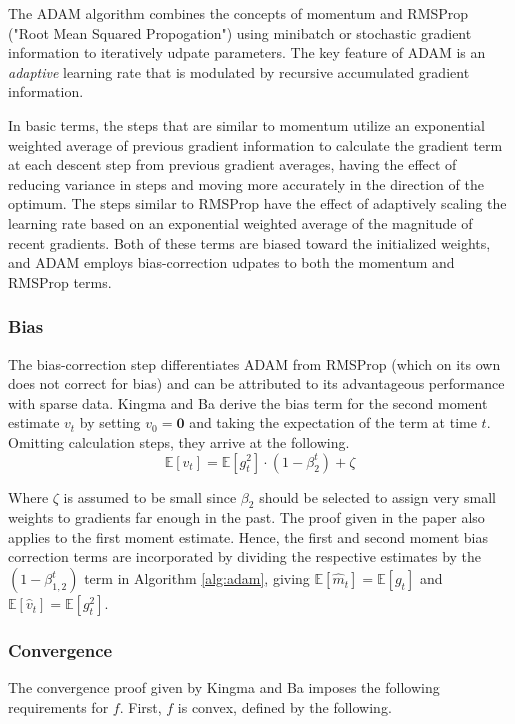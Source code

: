 \documentclass[letterpaper,11 pt]{article}
\begin{document}
The ADAM algorithm combines the concepts of momentum and RMSProp ("Root Mean Squared Propogation") using minibatch or stochastic gradient information to iteratively udpate parameters. The key feature of ADAM is an \textit{adaptive} learning rate that is modulated by recursive accumulated gradient information.  

In basic terms, the steps that are similar to momentum utilize an exponential weighted average of previous gradient information to calculate the gradient term at each descent step from previous gradient averages, having the effect of reducing variance in steps and moving more accurately in the direction of the optimum.  The steps similar to RMSProp have the effect of adaptively scaling the learning rate based on an exponential weighted average of the magnitude of recent gradients.  Both of these terms are biased toward the initialized weights, and ADAM employs bias-correction udpates to both the momentum and RMSProp terms.  

\subsubsection{Bias}

The bias-correction step differentiates ADAM from RMSProp (which on its own does not correct for bias) and can be attributed to its advantageous performance with sparse data. Kingma and Ba derive the bias term for the second moment estimate $v_{t}$ by setting $v_{0}=\textbf{0}$ and taking the expectation of the term at time $t$. Omitting calculation steps, they arrive at the following.
\[
\mathbb{E}[v_{t}]=\mathbb{E}[g_{t}^{2}]\cdot(1-\beta_{2}^{t})+\zeta
\]

Where $\zeta$ is assumed to be small since $\beta_{2}$ should be selected to assign very small weights to gradients far enough in the past.  The proof given in the paper also applies to the first moment estimate.  Hence, the first  and second moment bias correction terms are incorporated by dividing the respective estimates by the $(1-\beta_{1,2}^t)$ term in Algorithm \ref{alg:adam}, giving  $\mathbb{E}[\hat{m}_{t}]=\mathbb{E}[g_{t}]$ and $\mathbb{E}[\hat{v}_{t}]=\mathbb{E}[g_{t}^{2}]$.

\subsubsection{Convergence}

The convergence proof given by Kingma and Ba imposes the following requirements for $f$.  First, $f$ is convex, defined by the following.
\end{document}
